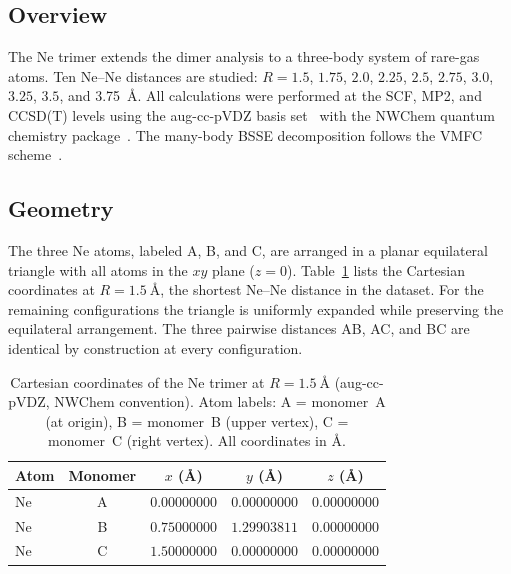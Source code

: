 \subsection{Overview}

The Ne trimer extends the dimer analysis to a three-body system of
rare-gas atoms. Ten Ne--Ne distances are studied: $R = 1.5$, $1.75$,
$2.0$, $2.25$, $2.5$, $2.75$, $3.0$, $3.25$, $3.5$, and
\SI{3.75}{\angstrom}. All calculations were performed at the SCF, MP2,
and CCSD(T) levels using the aug-cc-pVDZ basis
set~\cite{dunning1989,kendall1992} with the NWChem quantum chemistry
package~\cite{nwchem2020}. The many-body BSSE decomposition follows
the VMFC scheme~\cite{valiron1997}.

\subsection{Geometry}

The three Ne atoms, labeled A, B, and C, are arranged in a planar
equilateral triangle with all atoms in the $xy$ plane ($z = 0$).
Table~\ref{tab:ne_trimer_geometry} lists the Cartesian coordinates at
$R = \SI{1.5}{\angstrom}$, the shortest Ne--Ne distance in the dataset.
For the remaining configurations the triangle is uniformly expanded
while preserving the equilateral arrangement. The three pairwise
distances AB, AC, and BC are identical by construction at every
configuration.

\begin{table}[!ht]
    \centering
    \caption{Cartesian coordinates of the Ne trimer at
    $R = \SI{1.5}{\angstrom}$ (aug-cc-pVDZ, NWChem convention).
    Atom labels: A = monomer~A (at origin), B = monomer~B
    (upper vertex), C = monomer~C (right vertex).
    All coordinates in \AA.}
    \label{tab:ne_trimer_geometry}
    \begin{tabular}{lcccc}
        \toprule
        Atom & Monomer & $x$ (\AA) & $y$ (\AA) & $z$ (\AA) \\
        \midrule
        Ne & A & $0.00000000$ & $0.00000000$ & $0.00000000$ \\
        Ne & B & $0.75000000$ & $1.29903811$ & $0.00000000$ \\
        Ne & C & $1.50000000$ & $0.00000000$ & $0.00000000$ \\
        \bottomrule
    \end{tabular}
\end{table}

